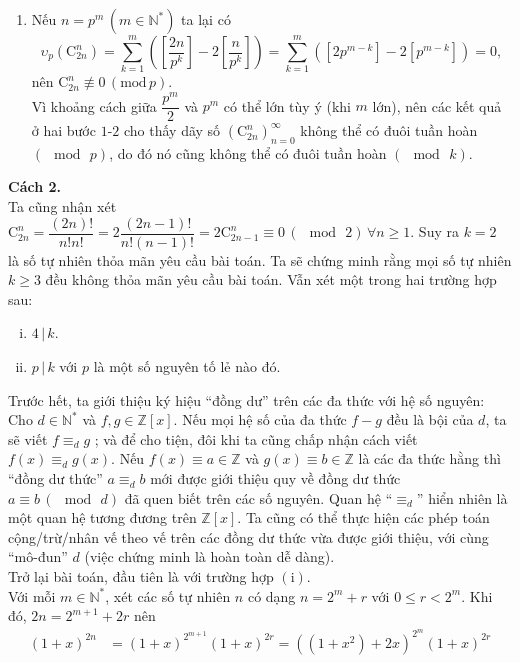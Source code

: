 \begin{bt}
{\begin{enumerate}
			tức là $\mathrm{C}_{2n}^n\equiv 0 \,(\mod\,p)$.
			\item Nếu $n=p^m\, (m\in\mathbb{N}^*)$ ta lại có 
			\[ \upsilon_p\left(\mathrm{C}_{2n}^n\right)=\sum\limits_{k=1}^m\left(\left[\dfrac{2n}{p^k}\right]-2\left[\dfrac{n}{p^k}\right]\right)=\sum\limits_{k=1}^m\left(\left[2p^{m-k}\right]-2\left[p^{m-k}\right]\right)=0, \]
			nên $\mathrm{C}_{2n}^n\not\equiv 0\, (\mathrm{mod}\,p)$.\\
			Vì khoảng cách giữa $\dfrac{p^m}{2}$ và $p^m$ có thể lớn tùy ý (khi $m$ lớn), nên các kết quả ở hai bước $1$-$2$ cho thấy dãy số $\left(\mathrm{C}_{2n}^n\right)_{n=0}^{\infty}$ không thể có đuôi tuần hoàn $(\mod\,p)$, do đó nó cũng không thể có đuôi tuần hoàn $(\mod\, k)$.
		\end{enumerate}
		\textbf{Cách 2.}\\
		Ta cũng nhận xét $\mathrm{C}_{2n}^n=\dfrac{(2n)!}{n!n!}=2\dfrac{(2n-1)!}{n!(n-1)!}=2\mathrm{C}_{2n-1}^n\equiv 0\,(\mod\,2)\,\forall n\ge 1$. Suy ra $k=2$ là số tự nhiên thỏa mãn yêu cầu bài toán. Ta sẽ chứng minh rằng mọi số tự nhiên $k\ge 3$ đều không thỏa mãn yêu cầu bài toán. Vẫn xét một trong hai trường hợp sau:
		\begin{enumerate}[(i)]
			\item $4\,|\,k$.
			\item $p\,|\,k$ với $p$ là một số nguyên tố lẻ nào đó.
		\end{enumerate}
		Trước hết, ta giới thiệu ký hiệu ``đồng dư'' trên các đa thức với hệ số nguyên: Cho $d\in\mathbb{N}^*$ và $f,g\in\mathbb{Z}[x]$. Nếu mọi hệ số của đa thức $f-g$ đều là bội của $d$, ta sẽ viết $f\equiv_d g$ ; và để cho tiện, đôi khi ta cũng chấp nhận cách viết $f(x)\equiv_d g(x)$. Nếu $f(x)\equiv a\in\mathbb{Z}$ và $g(x)\equiv b\in\mathbb{Z}$ là các đa thức hằng thì ``đồng dư thức'' $a\equiv_d b$ mới được giới thiệu quy về đồng dư thức $a\equiv b \,(\mod\,d)$ đã quen biết trên các số nguyên. Quan hệ ``$\equiv_d$'' hiển nhiên là một quan hệ tương đương trên $\mathbb{Z}[x]$. Ta cũng có thể thực hiện các phép toán cộng/trừ/nhân vế theo vế trên các đồng dư thức vừa được giới thiệu, với cùng ``mô-đun'' $d$ (việc chứng minh là hoàn toàn dễ dàng).\\
		Trở lại bài toán, đầu tiên là với trường hợp $(\mathrm{i})$.\\
		Với mỗi $m\in\mathbb{N}^*$, xét các số tự nhiên $n$ có dạng $n=2^m+r$ với $0\le r<2^m$. Khi đó, $2n=2^{m+1}+2r$ nên 
		\begin{align*}
		(1+x)^{2n}&=(1+x)^{2^{m+1}}(1+x)^{2r}=\left((1+x^2)+2x\right)^{2^m}(1+x)^{2r}\\

\end{align*}}
\end{bt}
